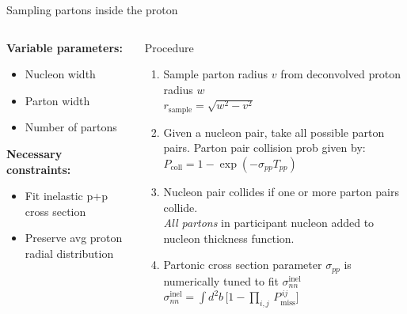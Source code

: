 \documentclass[aspectratio=43]{beamer}
\theoremstyle{definition}
\begin{document}
\begin{frame}{Sampling partons inside the proton}
  \begin{columns}
    \begin{column}{.4\textwidth}
      \textbf{Variable parameters:}
      \begin{itemize}
        \item Nucleon width
        \item Parton width
        \item Number of partons
      \end{itemize}
      \bigskip
      \textbf{Necessary constraints:}
      \begin{itemize}
        \item Fit inelastic p+p \\
              cross section
        \item Preserve avg proton radial distribution
      \end{itemize}
    \end{column}
    \vline \hspace{1 cm}
    \begin{column}{.5\textwidth}
      \begin{block}{Procedure}
        \scriptsize
        \begin{enumerate}
          \item Sample parton radius $v$ from deconvolved proton radius $w$ \\[1ex]
                $r_\mathrm{sample} = \sqrt{w^2 - v^2}$
          \item Given a nucleon pair, take all possible parton pairs.
                Parton pair collision prob given by:\\[1ex]
                $P_\mathrm{coll} = 1 - \exp(-\sigma_{pp} T_{pp})$
          \item Nucleon pair collides if one or more parton pairs collide.\\[1ex]
                \emph{All partons} in participant nucleon added to nucleon
                thickness function.
              \item Partonic cross section parameter $\sigma_{pp}$ is numerically
                tuned to fit $\sigma^\mathrm{inel}_{nn}$ \\[1ex]
                $\sigma_{nn}^\mathrm{inel} = \int d^2b\, \big[1 - \prod\limits_{i,j} \,P_\mathrm{miss}^{\,ij}\big]$
        \end{enumerate}
      \end{block}
    \end{column}
  \end{columns}
\end{frame}
\end{document}
